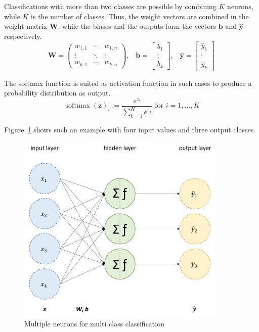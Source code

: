 Classifications with more than two classes are possible by combining $K$ neurons, while $K$ is the number of classes. Thus, the weight vectors are combined in the weight matrix $\mathbf{W}$, while the biases and the outputs form the vectors $\mathbf{b}$ and $\mathbf{\hat{y}}$ respectively.
\begin{equation}
    \mathbf{W} = \begin{pmatrix}w_{1,1}&\cdots &w_{1,n}\\\vdots &\ddots &\vdots\\w_{k,1}&\cdots &w_{k,n}\end{pmatrix}\text{,}\quad\mathbf{b} = \begin{bmatrix}b_1\\\vdots \\b_k\end{bmatrix}\text{,}\quad\mathbf{\hat{y}} = \begin{bmatrix}\hat{y}_1\\\vdots \\\hat{y}_k\end{bmatrix}
\end{equation}

The softmax function is suited as activation function in such cases to produce a probability distribution as output.
\begin{equation}
    \operatorname{softmax}(\mathbf{z})_{i} := {\frac{e^{z_{i}}}{\sum_{k=1}^{K}e^{z_{k}}}}\text{ for }i=1,\dotsc ,K
\end{equation}

Figure~\ref{fig:neurons} shows such an example with four input values and three output classes.

\begin{figure}[H]
    \begin{center}
    \includegraphics[width=10cm]{../images/neurons.png}
    \caption{Multiple neurons for multi class classification}\label{fig:neurons}
    \end{center}
\end{figure}

